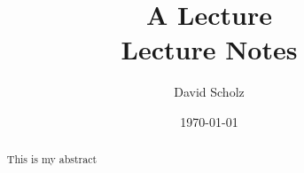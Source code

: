 \documentclass[a4paper,12pt,oneside]{article}
\title{A Lecture\\[0.3cm] \Large Lecture Notes}
\date{\today}
\author{David Scholz}
\theoremstyle{plain}
\theoremstyle{definition}
\theoremstyle{definition}
\begin{document}
\begin{titlingpage}
\maketitle
\end{titlingpage}

\newpage

\setcounter{page}{1} %

\thispagestyle{empty}
  
\newpage  
\pagestyle{empty}

\newpage

\begin{abstract}
    This is my abstract
\end{abstract} 


\newpage
\pagestyle{empty}

\tableofcontents

\newpage
\pagestyle{fancy} 


\thispagestyle{empty}
\listoffigures

\newpage
\pagestyle{fancy}


\newpage


\thispagestyle{empty}
    
\end{document}
